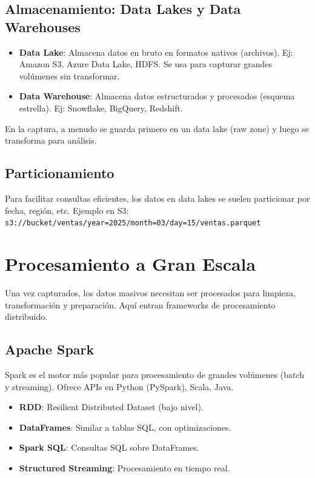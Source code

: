 \documentclass[12pt,a4paper,openany,oneside]{book}
\begin{document}
\section{Almacenamiento: Data Lakes y Data Warehouses}
\begin{itemize}
    \item \textbf{Data Lake}: Almacena datos en bruto en formatos nativos (archivos). Ej: Amazon S3, Azure Data Lake, HDFS. Se usa para capturar grandes volúmenes sin transformar.
    \item \textbf{Data Warehouse}: Almacena datos estructurados y procesados (esquema estrella). Ej: Snowflake, BigQuery, Redshift.
\end{itemize}
En la captura, a menudo se guarda primero en un data lake (raw zone) y luego se transforma para análisis.

\section{Particionamiento}
Para facilitar consultas eficientes, los datos en data lakes se suelen particionar por fecha, región, etc.
Ejemplo en S3: \texttt{s3://bucket/ventas/year=2025/month=03/day=15/ventas.parquet}

\chapter{Procesamiento a Gran Escala}
Una vez capturados, los datos masivos necesitan ser procesados para limpieza, transformación y preparación. Aquí entran frameworks de procesamiento distribuido.

\section{Apache Spark}
Spark es el motor más popular para procesamiento de grandes volúmenes (batch y streaming). Ofrece APIs en Python (PySpark), Scala, Java.

\begin{itemize}
    \item \textbf{RDD}: Resilient Distributed Dataset (bajo nivel).
    \item \textbf{DataFrames}: Similar a tablas SQL, con optimizaciones.
    \item \textbf{Spark SQL}: Consultas SQL sobre DataFrames.
    \item \textbf{Structured Streaming}: Procesamiento en tiempo real.
\end{itemize}
\end{document}
